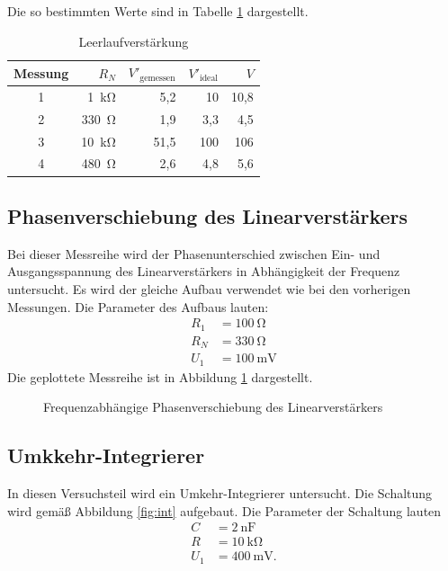 Die so bestimmten Werte sind in Tabelle \ref{tab:leerlauf} dargestellt.
\begin{table}
	\centering
	\begin{tabular}{c r r r r}
		\toprule
		Messung & $R_N$ & $V'_\text{gemessen}$ & $V'_\text{ideal}$ & $V$ \\
		\midrule
		1 & \SI{1}{\kilo \ohm} & 5,2 & 10 & 10,8 \\
		2 & \SI{330}{\ohm} & 1,9 & 3,3 & 4,5 \\
		3 & \SI{10}{\kilo \ohm} & 51,5 & 100 & 106 \\
		4 & \SI{480}{\ohm} & 2,6 & 4,8 & 5,6 \\
		\bottomrule
	\end{tabular}
	\caption{Leerlaufverstärkung}
	\label{tab:leerlauf}
\end{table}

\subsection{Phasenverschiebung des Linearverstärkers}
Bei dieser Messreihe wird der Phasenunterschied zwischen Ein- und Ausgangsspannung des Linearverstärkers in Abhängigkeit der Frequenz untersucht.
Es wird der gleiche Aufbau verwendet wie bei den vorherigen Messungen.
Die Parameter des Aufbaus lauten:
\begin{align}
	R_1 &= \SI{100}{\ohm} \\
	R_N &= \SI{330}{\ohm} \\
	U_1 &= \SI{100}{\milli \volt}
\end{align}
Die geplottete Messreihe ist in Abbildung \ref{fig:phase} dargestellt.

\begin{figure}
	\centering
	\resizebox{\pltwidth}{!}{
		
	}
	\caption{Frequenzabhängige Phasenverschiebung des Linearverstärkers}
	\label{fig:phase}
\end{figure}

\subsection{Umkkehr-Integrierer}
In diesen Versuchsteil wird ein Umkehr-Integrierer untersucht.
Die Schaltung wird gemäß Abbildung \ref{fig:int} aufgebaut.
Die Parameter der Schaltung lauten
\begin{align}
	C &= \SI{2}{\nano \farad} \\
	R &= \SI{10}{\kilo \ohm} \\
	U_1 &= \SI{400}{\milli \volt}.
\end{align}

